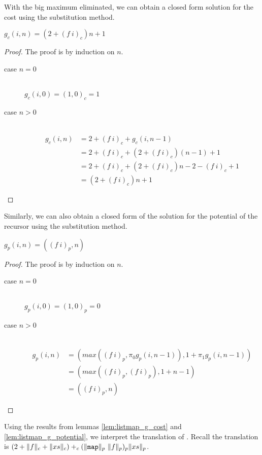 %
With the big maximum eliminated, we can obtain a closed form solution for the
cost using the substitution method.
%
\begin{lemma}
  \label{lem:listmap_g_cost}
  $g_c(i,n) = (2 + (f\ i)_c) n + 1$
\end{lemma}
%
\begin{proof}
  The proof is by induction on $n$.
  \begin{description}
    \item[case $n=0$]\hfill \\
      $g_c(i,0) = (1,0)_c = 1$
    \item[case $n>0$]\hfill \\
      \begin{align*}
        g_c(i,n) &= 2 + (f\ i)_c + g_c(i,n-1)\\
                 &= 2 + (f\ i)_c + (2 + (f\ i)_c)(n-1) + 1\\
                 &= 2 + (f\ i)_c + (2 + (f\ i)_c) n - 2 - (f\ i)_c + 1\\
                 &= (2 + (f\ i)_c) n + 1
      \end{align*}
    \end{description}
\end{proof}
%
Similarly, we can also obtain a closed form of the solution for the potential
of the recursor using the substitution method.
%
\begin{lemma}
  \label{lem:listmap_g_potential}
  $g_p(i,n) = ((f\ i)_p, n)$
\end{lemma}
%
\begin{proof}
  The proof is by induction on $n$.
  \begin{description}
    \item[case $n=0$]\hfill \\
      $g_p(i,0) = (1,0)_p = 0$
    \item[case $n>0$]\hfill \\
      \begin{align*}
        g_p(i,n) &= (max((f\ i)_p,\pi_0g_p(i,n-1)), 1 + \pi_1 g_p(i,n-1)) \\
                 &= (max((f\ i)_p, (f\ i)_p), 1 + n - 1) \\
                 &= ((f\ i)_p, n)
      \end{align*}
  \end{description}
\end{proof}
%
Using the results from lemmas \ref{lem:listmap_g_cost} and
\ref{lem:listmap_g_potential}, we interpret the translation of .
Recall the translation is $(2 + \|f\|_c + \|xs\|_c) +_c (\|\T{map}\|_p\ \|f\|_p)_p \|xs\|_p$.
